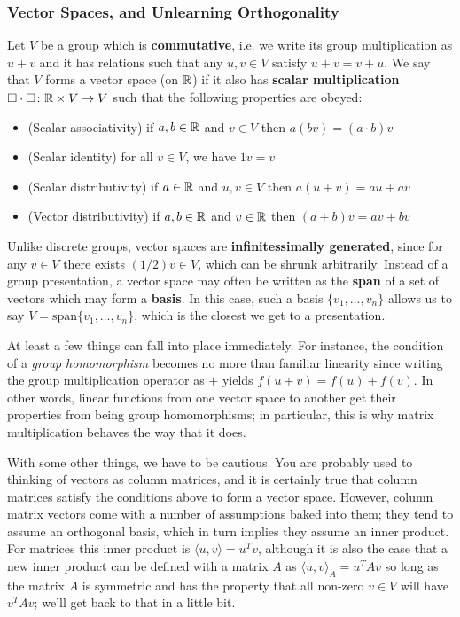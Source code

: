\documentclass[11pt]{article}
\begin{document}
\subsubsection{Vector Spaces, and Unlearning Orthogonality}

\begin{definition}
Let $V$ be a group which is \textbf{commutative}, i.e. we write its group multiplication as $u + v$ and it has relations such that any $u,v \in V$ satisfy $u + v = v + u$. We say that $V$ forms a vector space (on $\mathbb{R}$) if it also has \textbf{scalar multiplication} $\square \cdot \square \colon \mathbb{R} \times V \to V$ such that the following properties are obeyed: \begin{itemize}
\item (Scalar associativity) if $a,b \in \mathbb{R}$ and $v \in V$ then $a(b v) = (a\cdot b) v$
\item (Scalar identity) for all $v \in V$, we have $1v = v$
\item (Scalar distributivity) if $a\in \mathbb{R}$ and $u,v \in V$ then $a(u + v) = au + av$
\item (Vector distributivity) if $a,b \in \mathbb{R}$ and $v \in \mathbb{R}$ then $(a + b) v = av + bv$
\end{itemize}
Unlike discrete groups, vector spaces are \textbf{infinitessimally generated}, since for any $v \in V$ there exists $(1/2)v \in V$, which can be shrunk arbitrarily. Instead of a group presentation, a vector space may often be written as the \textbf{span} of a set of vectors which may form a \textbf{basis}. In this case, such a basis $\{v_1,\dots, v_n \}$ allows us to say $V = \mathrm{span}\{v_1,\dots, v_n \}$, which is the closest we get to a presentation.
\end{definition}

At least a few things can fall into place immediately. For instance, the condition of a \emph{group homomorphism} becomes no more than familiar linearity since writing the group multiplication operator as $+$ yields $f(u+v) = f(u) + f(v)$. In other words, linear functions from one vector space to another get their properties from being group homomorphisms; in particular, this is why matrix multiplication behaves the way that it does.

With some other things, we have to be cautious. You are probably used to thinking of vectors as column matrices, and it is certainly true that column matrices satisfy the conditions above to form a vector space. However, column matrix vectors come with a number of assumptions baked into them; they tend to assume an orthogonal basis, which in turn implies they assume an inner product. For matrices this inner product is $\langle u,v \rangle = u^T v$, although it is also the case that a new inner product can be defined with a matrix $A$ as $\langle u,v \rangle_A = u^T A v$ so long as the matrix $A$ is symmetric and has the property that all non-zero $v \in V$ will have $v^T A v$; we'll get back to that in a little bit.
\end{document}
